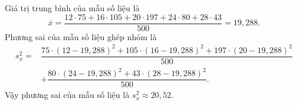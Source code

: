 \begin{ex}
{\begin{itemchoice}
\begin{center}
\begin{tabular}{|l|c|c|c|c|c|}
					\hline
				\end{tabular}
			\end{center}
			Giá trị trung bình của mẫu số liệu là \[\overline{x} = \dfrac{12\cdot 75+16\cdot 105+20\cdot 197+24\cdot 80+28\cdot 43}{500} = 19{,}288.\]
			Phương sai của mẫu số liệu ghép nhóm là 
			\allowdisplaybreaks
			\begin{align*}
				s_x^2 =& \dfrac{75\cdot (12-19{,}288)^2 +105\cdot (16-19{,}288)^2+197 \cdot (20-19{,}288)^2}{500}\\
				&+\dfrac{80\cdot (24-19{,}288)^2+43\cdot (28-19{,}288)^2}{500}.
			\end{align*}
			Vậy phương sai của mẫu số liệu là $s_x^2 \approx 20{,}52$.
		\end{itemchoice}			
	}
\end{ex}


